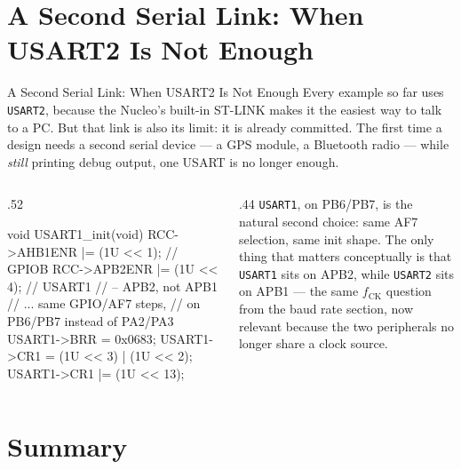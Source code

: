 \documentclass[9pt,aspectratio=169,xcolor=table]{beamer}
\begin{document}
\section{A Second Serial Link: When USART2 Is Not Enough}

\begin{frame}[fragile]{A Second Serial Link: When USART2 Is Not Enough}
    \leavevmode
    {\small Every example so far uses \texttt{USART2}, because the Nucleo's
    built-in ST-LINK makes it the easiest way to talk to a PC. But that link is
    also its limit: it is already committed. The first time a design needs a
    \alert{second} serial device --- a GPS module, a Bluetooth radio --- while
    \emph{still} printing debug output, one USART is no longer enough.}

    \vspace{2mm}
    \begin{columns}[c]
    \begin{column}{.52\textwidth}
    \begin{cc}[basicstyle=\scriptsize\ttfamily]
void USART1_init(void)
{
    RCC->AHB1ENR |= (1U << 1);  // GPIOB
    RCC->APB2ENR |= (1U << 4);  // USART1
                                 // -- APB2, not APB1
    // ... same GPIO/AF7 steps,
    // on PB6/PB7 instead of PA2/PA3
    USART1->BRR = 0x0683;
    USART1->CR1 = (1U << 3) | (1U << 2);
    USART1->CR1 |= (1U << 13);
}
    \end{cc}
    \end{column}
    \begin{column}{.44\textwidth}
        {\small \texttt{USART1}, on PB6/PB7, is the natural second choice: same
        AF7 selection, same init shape. The only thing that matters
        conceptually is that \texttt{USART1} sits on \alert{APB2}, while
        \texttt{USART2} sits on \alert{APB1} --- the same $f_{\text{CK}}$
        question from the baud rate section, now relevant because the two
        peripherals no longer share a clock source.}
    \end{column}
    \end{columns}
\end{frame}


\section{Summary}
\end{document}
